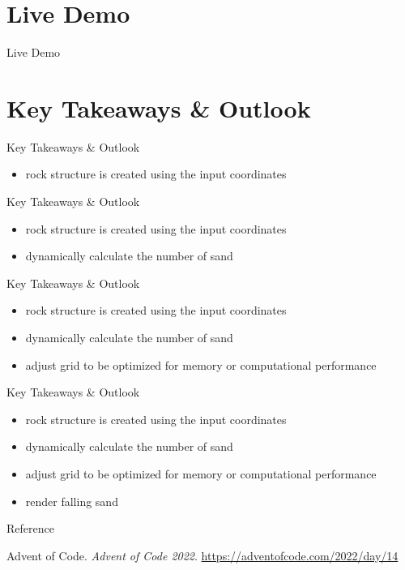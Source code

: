 \documentclass{beamer}
\begin{document}
\section{Live Demo}

\begin{frame}{Live Demo}
\end{frame}

\section{Key Takeaways \& Outlook}

\begin{frame}{Key Takeaways \& Outlook}
    \begin{itemize}
        \item rock structure is created using the input coordinates
    \end{itemize}
\end{frame}

\begin{frame}{Key Takeaways \& Outlook}
    \begin{itemize}
        \item rock structure is created using the input coordinates
        \item dynamically calculate the number of sand
    \end{itemize}
\end{frame}

\begin{frame}{Key Takeaways \& Outlook}
    \begin{itemize}
        \item rock structure is created using the input coordinates
        \item dynamically calculate the number of sand
        \item adjust grid to be optimized for memory or computational performance
    \end{itemize}
\end{frame}

\begin{frame}{Key Takeaways \& Outlook}
    \begin{itemize}
        \item rock structure is created using the input coordinates
        \item dynamically calculate the number of sand
        \item adjust grid to be optimized for memory or computational performance
        \item render falling sand
    \end{itemize}
\end{frame}

\begin{frame}{Reference}
    \begin{thebibliography}{99}
         Advent of Code. \textit{Advent of Code 2022}. \url{https://adventofcode.com/2022/day/14}
    \end{thebibliography}
\end{frame}
\end{document}
